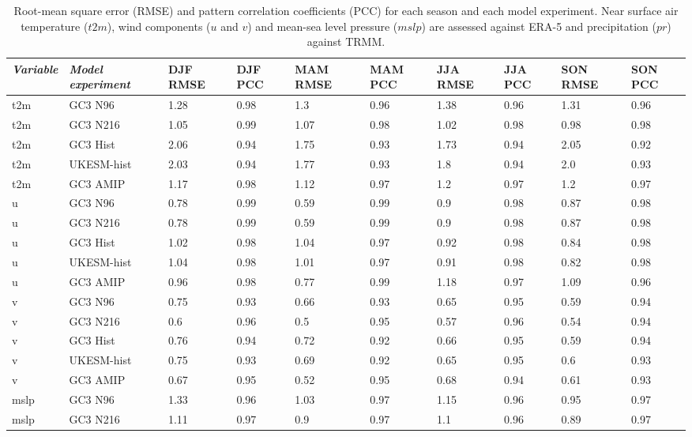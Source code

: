 \begin{table}[t!]
\small
\caption{\small Root-mean square error (RMSE) and pattern correlation coefficients (PCC) for each season and each model experiment. Near surface air temperature ($t2m$), wind components ($u$ and $v$) and mean-sea level pressure ($mslp$) are assessed against ERA-5 and precipitation ($pr$) against TRMM.}
\begin{tabular}{p{1.25cm}|p{2.5cm}|p{1.10cm}p{1.10cm}p{1.10cm}p{1.10cm}p{1.10cm}p{0.9cm}p{1.05cm}p{1.05cm}} \label{tab:s1}
  \textit{Variable}                  & \textit{Model experiment}  & DJF RMSE & DJF PCC & MAM RMSE & MAM PCC & JJA RMSE & JJA PCC &  SON RMSE & SON PCC \\ \hline \hline
t2m & GC3 N96 & 1.28 & 0.98 & 1.3 & 0.96 & 1.38 & 0.96 & 1.31 & 0.96 \\
t2m & GC3 N216 & 1.05 & 0.99 & 1.07 & 0.98 & 1.02 & 0.98 & 0.98 & 0.98 \\
t2m & GC3 Hist & 2.06 & 0.94 & 1.75 & 0.93 & 1.73 & 0.94 & 2.05 & 0.92 \\
t2m & UKESM-hist & 2.03 & 0.94 & 1.77 & 0.93 & 1.8 & 0.94 & 2.0 & 0.93 \\
t2m & GC3 AMIP & 1.17 & 0.98 & 1.12 & 0.97 & 1.2 & 0.97 & 1.2 & 0.97 \\
u & GC3 N96 & 0.78 & 0.99 & 0.59 & 0.99 & 0.9 & 0.98 & 0.87 & 0.98 \\
u & GC3 N216 & 0.78 & 0.99 & 0.59 & 0.99 & 0.9 & 0.98 & 0.87 & 0.98 \\
u & GC3 Hist & 1.02 & 0.98 & 1.04 & 0.97 & 0.92 & 0.98 & 0.84 & 0.98 \\
u & UKESM-hist & 1.04 & 0.98 & 1.01 & 0.97 & 0.91 & 0.98 & 0.82 & 0.98 \\
u & GC3 AMIP & 0.96 & 0.98 & 0.77 & 0.99 & 1.18 & 0.97 & 1.09 & 0.96 \\
v & GC3 N96 & 0.75 & 0.93 & 0.66 & 0.93 & 0.65 & 0.95 & 0.59 & 0.94 \\
v & GC3 N216 & 0.6 & 0.96 & 0.5 & 0.95 & 0.57 & 0.96 & 0.54 & 0.94 \\
v & GC3 Hist & 0.76 & 0.94 & 0.72 & 0.92 & 0.66 & 0.95 & 0.59 & 0.94 \\
v & UKESM-hist & 0.75 & 0.93 & 0.69 & 0.92 & 0.65 & 0.95 & 0.6 & 0.93 \\
v & GC3 AMIP & 0.67 & 0.95 & 0.52 & 0.95 & 0.68 & 0.94 & 0.61 & 0.93 \\
mslp & GC3 N96 & 1.33 & 0.96 & 1.03 & 0.97 & 1.15 & 0.96 & 0.95 & 0.97 \\
mslp & GC3 N216 & 1.11 & 0.97 & 0.9 & 0.97 & 1.1 & 0.96 & 0.89 & 0.97 \\

\end{tabular}
\end{table}
